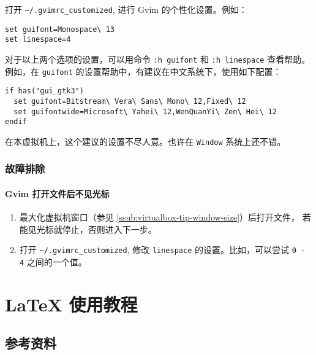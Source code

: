 \documentclass[cn,11pt, simple]{elegantbook}
\begin{document}
打开 \lstinline{~/.gvimrc_customized}, 进行 Gvim 的个性化设置。例如：
\begin{lstlisting}[escapeinside=``]
set guifont=Monospace\ 13
set linespace=4
\end{lstlisting}
对于以上两个选项的设置，可以用命令 \lstinline{:h guifont} 和
\lstinline{:h linespace} 查看帮助。
例如，在 \lstinline{guifont} 的设置帮助中，有建议在中文系统下，使用如下配置：
\begin{lstlisting}[escapeinside=``]
if has("gui_gtk3")
  set guifont=Bitstream\ Vera\ Sans\ Mono\ 12,Fixed\ 12
  set guifontwide=Microsoft\ Yahei\ 12,WenQuanYi\ Zen\ Hei\ 12
endif
\end{lstlisting}
\begin{note}\label{note:guifont}
    在本虚拟机上，这个建议的设置不尽人意。也许在 \lstinline{Window}
    系统上还不错。
\end{note}


\subsection{故障排除}%
\label{sub:vim-troubleshooting}

\subsubsection{Gvim 打开文件后不见光标}%
\label{ssub:vim-ts-cursor}

\begin{enumerate}
    \item 最大化虚拟机窗口（参见
        \ref{ssub:virtualbox-tip-window-size}）后打开文件，
        若能见光标就停止，否则进入下一步。
    \item 打开 \lstinline{~/.gvimrc_customized}, 修改
        \lstinline{linespace} 的设置。比如，可以尝试  \lstinline{0 - 4}
        之间的一个值。
\end{enumerate}


%

\chapter{\LaTeX{} 使用教程}%
\label{cha:latex-tips}

\section{参考资料}%
\label{sec:latex-refs}
\end{document}
